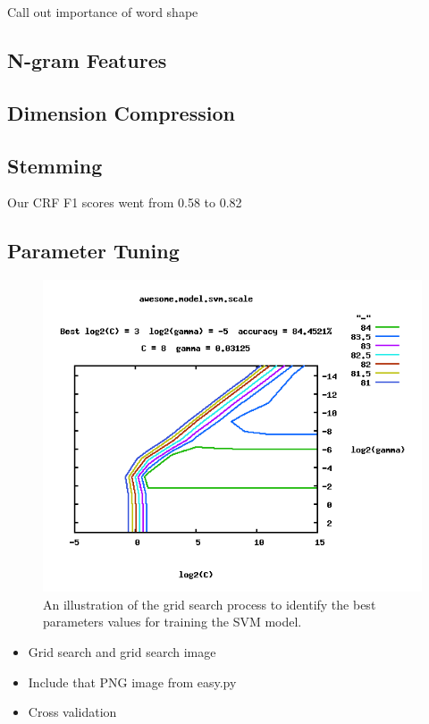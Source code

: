 \documentclass[preprint]{style}
\begin{document}
Call out importance of word shape

\subsection{N-gram Features}

\subsection{Dimension Compression}

\subsection{Stemming}

Our CRF F1 scores went from 0.58 to 0.82

\subsection{Parameter Tuning}

\begin{figure}
\begin{center}
	\includegraphics[width=1\columnwidth]{figures/parameter-selection.png}
\end{center}
\caption{An illustration of the grid search process to identify the best parameters values for training the SVM model.}
\label{fig:parameter_selection}
\end{figure}

\begin{itemize}

\item Grid search and grid search image

\item Include that PNG image from easy.py

\item Cross validation

\end{itemize}
\end{document}
